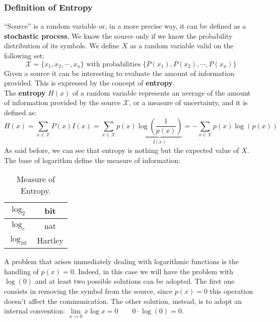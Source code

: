 
\subsubsection{Definition of Entropy}
``Source''  is a random variable or, in a more precise way, it can be defined as a \textbf{stochastic process}. We know the source only if we know the probability distribution of its symbols.
We define $X$ as a random variable valid on the following set:
$$\mathcal{X} = \{x_1, x_2, \cdots, x_n\} \text{ with probabilities } \{P(x_1), P(x_2),\cdots, P(x_n)\} $$
Given a source it can be interesting to evaluate the amount of information provided. This is expressed by the concept of \textbf{entropy}.\\
The \textbf{entropy} $H(x)$ of a random variable represents an average of the amount of information provided by the source $\mathcal{X}$, or a measure of uncertainty, and it is defined as:
$$H(x) = \sum_{x \in \mathcal{X}} P(x)I(x) = \sum_{x \in \mathcal{X}} p(x) \underbrace{\log\left( \frac{1}{p(x)}\right)}_{I(x)} = - \sum_{x \in \mathcal{X}} p(x) \log(p(x))$$
As said before, we can see that entropy is nothing but the expected value of $X$.
The base of logarithm define the measure of information:
\begin{table}[H]
	\centering
	\begin{tabular}{| c | c |}
		\hline
		$\log_2$ & bit\\
		\hline
		$\log_e$ & nat\\
		\hline
		$\log_{10}$ & Hartley\\
		\hline
	\end{tabular}
	\caption{Measure of Entropy.}
\end{table}

A problem that arises immediately dealing with logarithmic functions is the handling of $p(x) = 0$. Indeed, in this case we will have the problem with $\log(0)$ and at least two possible solutions can be adopted. The first one consists in removing the symbol from the source, since $p(x) = 0$ this operation doesn't affect the communication. The other solution, instead, is to adopt an internal convention: $\lim\limits_{x\rightarrow 0}x \log x = 0 	\qquad 0 \cdot \log(0) = 0$.

